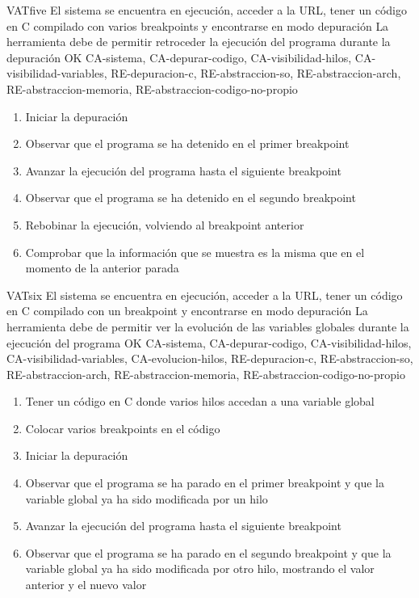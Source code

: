 \begin{testCase}{VAT}{five}
    {El sistema se encuentra en ejecución, acceder a la URL, tener un código en C compilado con varios breakpoints y encontrarse en modo depuración}
    {\NA}
    {La herramienta debe de permitir retroceder la ejecución del programa durante la depuración}
    {OK}
    {CA-sistema, CA-depurar-codigo, CA-visibilidad-hilos, CA-visibilidad-variables, RE-depuracion-c, RE-abstraccion-so, RE-abstraccion-arch, RE-abstraccion-memoria, RE-abstraccion-codigo-no-propio}
    \begin{enumerate}
        \item Iniciar la depuración
        \item Observar que el programa se ha detenido en el primer breakpoint
        \item Avanzar la ejecución del programa hasta el siguiente breakpoint
        \item Observar que el programa se ha detenido en el segundo breakpoint
        \item Rebobinar la ejecución, volviendo al breakpoint anterior
        \item Comprobar que la información que se muestra es la misma que en el momento de la anterior parada
    \end{enumerate}
\end{testCase}

\begin{testCase}{VAT}{six}
    {El sistema se encuentra en ejecución, acceder a la URL, tener un código en C compilado con un breakpoint y encontrarse en modo depuración}
    {\NA}
    {La herramienta debe de permitir ver la evolución de las variables globales durante la ejecución del programa}
    {OK}
    {CA-sistema, CA-depurar-codigo, CA-visibilidad-hilos, CA-visibilidad-variables, CA-evolucion-hilos, RE-depuracion-c, RE-abstraccion-so, RE-abstraccion-arch, RE-abstraccion-memoria, RE-abstraccion-codigo-no-propio}
    \begin{enumerate}
        \item Tener un código en C donde varios hilos accedan a una variable global
        \item Colocar varios breakpoints en el código
        \item Iniciar la depuración
        \item Observar que el programa se ha parado en el primer breakpoint y que la variable global ya ha sido modificada por un hilo
        \item Avanzar la ejecución del programa hasta el siguiente breakpoint
        \item Observar que el programa se ha parado en el segundo breakpoint y que la variable global ya ha sido modificada por otro hilo, mostrando el valor anterior y el nuevo valor
    \end{enumerate}
\end{testCase}

